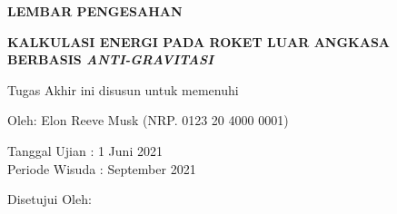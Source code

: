 \begin{center}
	\large\textbf{LEMBAR PENGESAHAN}
\end{center}

\thispagestyle{empty}

\begin{center}
  \textbf{KALKULASI ENERGI PADA ROKET LUAR ANGKASA BERBASIS \emph{ANTI-GRAVITASI}}
\end{center}

\begingroup
  \small

  \begin{center}
    Tugas Akhir ini disusun untuk memenuhi \lipsum[1][1]
  \end{center}

  \begin{center}
    Oleh: Elon Reeve Musk (NRP. 0123 20 4000 0001)
  \end{center}

  \begin{center}
    Tanggal Ujian : 1 Juni 2021\\
    Periode Wisuda : September 2021
  \end{center}

  \begin{center}
    Disetujui Oleh:
  \end{center}

  \begingroup
    \setlength{\tabcolsep}{0pt}

